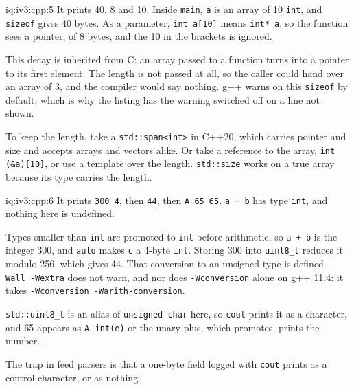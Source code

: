 \begin{solution}{iq:iv3:cpp:5}
It prints 40, 8 and 10. Inside \texttt{main}, \texttt{a} is an array of 10 \texttt{int}, and \texttt{sizeof} gives 40 bytes. As a parameter, \texttt{int a[10]} means \texttt{int* a}, so the function sees a pointer, of 8 bytes, and the 10 in the brackets is ignored.

This decay is inherited from C: an array passed to a function turns into a pointer to its first element. The length is not passed at all, so the caller could hand over an array of 3, and the compiler would say nothing. g++ warns on this \texttt{sizeof} by default, which is why the listing has the warning switched off on a line not shown.

To keep the length, take a \texttt{std::span<int>} in C++20, which carries pointer and size and accepts arrays and vectors alike. Or take a reference to the array, \texttt{int (\&a)[10]}, or use a template over the length. \texttt{std::size} works on a true array because its type carries the length.

\end{solution}

\begin{solution}{iq:iv3:cpp:6}
It prints \texttt{300 4}, then \texttt{44}, then \texttt{A 65 65}. \texttt{a + b} has type \texttt{int}, and nothing here is undefined.

Types smaller than \texttt{int} are promoted to \texttt{int} before arithmetic, so \texttt{a + b} is the integer 300, and \texttt{auto} makes \texttt{c} a 4-byte \texttt{int}. Storing 300 into \texttt{uint8\_t} reduces it modulo 256, which gives 44. That conversion to an unsigned type is defined. \texttt{-Wall -Wextra} does not warn, and nor does \texttt{-Wconversion} alone on g++ 11.4: it takes \texttt{-Wconversion -Warith-conversion}.

\texttt{std::uint8\_t} is an alias of \texttt{unsigned char} here, so \texttt{cout} prints it as a character, and 65 appears as \texttt{A}. \texttt{int(e)} or the unary plus, which promotes, prints the number.

The trap in feed parsers is that a one-byte field logged with \texttt{cout} prints as a control character, or as nothing.

\end{solution}

